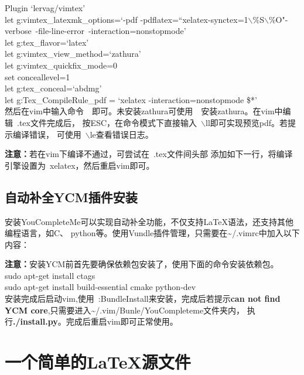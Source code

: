 \documentclass[12pt]{article}
\begin{document}
\noindent Plugin `lervag/vimtex'\\
let g:vimtex\_latexmk\_options=`-pdf
-pdflatex=``xelatex-synctex=1$\backslash$\quad\%S$\backslash$\quad\%O"\quad-verbose\
-file-line-error\ -interaction=nonstopmode' \\
let g:tex\_flavor=`latex' \\
let g:vimtex\_view\_method=`zathura' \\
let g:vimtex\_quickfix\_mode=0 \\
set conceallevel=1 \\
let g:tex\_conceal=`abdmg' \\
let g:Tex\_CompileRule\_pdf = `xelatex -interaction=nonstopmode \$*' \\
然后在vim中输入命令\ \ 即可。未安装zathura可使用\ \ 安装zathura。在vim中编辑\ .tex文件完成后，
按ESC，在命令模式下直接输入\ $\backslash$ll即可实现预览pdf。若提示编译错误，
可使用\ $\backslash$le查看错误日志。

\textbf{注意：}若在vim下编译不通过，可尝试在\ .tex文件间头部
添加如下一行，将编译引擎设置为\ xelatex，然后重启vim即可。
\begin{center}
\end{center}

\subsection{自动补全YCM插件安装}
安装YouCompleteMe可以实现自动补全功能，不仅支持\LaTeX 语法，还支持其他编程语言，如C、
python等。使用Vundle插件管理，只需要在\textasciitilde/.vimrc中加入以下内容：
\begin{center}
\end{center}
\textbf{注意：}安装YCM前首先要确保依赖包安装了，使用下面的命令安装依赖包。\\
sudo apt-get install ctags \\
sudo apt-get install build-essential cmake python-dev \\
安装完成后启动vim,使用\ :BundleInstall来安装，完成后若提示\textbf{can
not find YCM core},只需要进入\textasciitilde/.vim/Bunle/YouCompleteme文件夹内，
执行\textbf{./install.py}。完成后重启vim即可正常使用。

\section{一个简单的\LaTeX 源文件}
\end{document}

